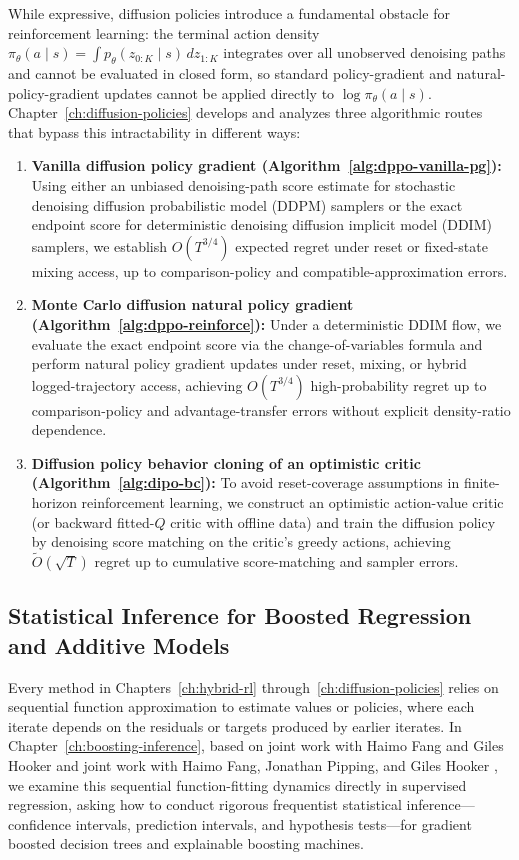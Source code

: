 \begin{aigenblock}
While expressive, diffusion policies introduce a fundamental obstacle for reinforcement learning: the terminal action density $\pi_\theta(a \mid s) = \int p_\theta(z_{0:K} \mid s)\,dz_{1:K}$ integrates over all unobserved denoising paths and cannot be evaluated in closed form, so standard policy-gradient and natural-policy-gradient updates cannot be applied directly to $\log \pi_\theta(a \mid s)$. Chapter~\ref{ch:diffusion-policies} develops and analyzes three algorithmic routes that bypass this intractability in different ways:
\begin{enumerate}
\item \textbf{Vanilla diffusion policy gradient (Algorithm~\ref{alg:dppo-vanilla-pg}):} Using either an unbiased denoising-path score estimate for stochastic denoising diffusion probabilistic model (DDPM) samplers or the exact endpoint score for deterministic denoising diffusion implicit model (DDIM) samplers, we establish $O(T^{3/4})$ expected regret under reset or fixed-state mixing access, up to comparison-policy and compatible-approximation errors.
\item \textbf{Monte Carlo diffusion natural policy gradient (Algorithm~\ref{alg:dppo-reinforce}):} Under a deterministic DDIM flow, we evaluate the exact endpoint score via the change-of-variables formula and perform natural policy gradient updates under reset, mixing, or hybrid logged-trajectory access, achieving $O(T^{3/4})$ high-probability regret up to comparison-policy and advantage-transfer errors without explicit density-ratio dependence.
\item \textbf{Diffusion policy behavior cloning of an optimistic critic (Algorithm~\ref{alg:dipo-bc}):} To avoid reset-coverage assumptions in finite-horizon reinforcement learning, we construct an optimistic action-value critic (or backward fitted-$Q$ critic with offline data) and train the diffusion policy by denoising score matching on the critic's greedy actions, achieving $\widetilde{O}(\sqrt{T})$ regret up to cumulative score-matching and sampler errors.
\end{enumerate}

\subsection{Statistical Inference for Boosted Regression and Additive Models}

Every method in Chapters~\ref{ch:hybrid-rl} through~\ref{ch:diffusion-policies} relies on sequential function approximation to estimate values or policies, where each iterate depends on the residuals or targets produced by earlier iterates. In Chapter~\ref{ch:boosting-inference}, based on joint work with Haimo Fang and Giles Hooker \citep{fang2025statistical} and joint work with Haimo Fang, Jonathan Pipping, and Giles Hooker \citep{fang2026statistical}, we examine this sequential function-fitting dynamics directly in supervised regression, asking how to conduct rigorous frequentist statistical inference---confidence intervals, prediction intervals, and hypothesis tests---for gradient boosted decision trees and explainable boosting machines.


\end{aigenblock}
